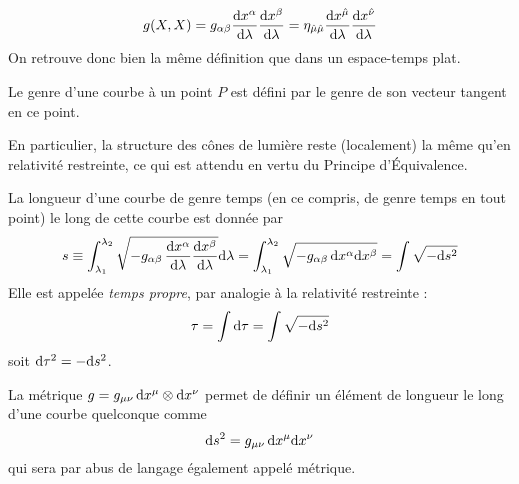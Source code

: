 \begin{equation}
   g(X, X) = g_{\alpha \beta}\frac{\mathrm{d} x^{\alpha}}{\mathrm{d} \lambda}\frac{\mathrm{d} x^{\beta}}{\mathrm{d} \lambda} = \eta_{\hat{\mu} \hat{\mu}}\frac{\mathrm{d} x^{\hat{\mu}}}{\mathrm{d} \lambda}\frac{\mathrm{d} x^{\hat{\nu}}}{\mathrm{d} \lambda}
\end{equation}
On retrouve donc bien la même définition que dans un espace-temps plat.
\begin{theoremframe}
    \begin{defi}
        Le genre d'une courbe à un point $P$ est défini par le genre de son vecteur tangent en ce point.
    \end{defi}
\end{theoremframe}
En particulier, la structure des cônes de lumière reste (localement) la même qu'en relativité restreinte, ce qui est attendu en vertu du Principe d'Équivalence.
\begin{theoremframe}
    \begin{defi}
        La longueur d'une courbe de genre temps (en ce compris, de genre temps en tout point) le long de cette courbe est donnée par 
            \begin{equation}
            s \equiv \int^{\lambda_2}_{\lambda_{1}}\sqrt{-g_{\alpha \beta}\,\frac{\mathrm{d} x^{\alpha}}{\mathrm{d}\lambda}\frac{\mathrm{d} x^{\beta}}{\mathrm{d} \lambda}} \mathrm{d}\lambda = \int^{\lambda_2}_{\lambda_{1}}\sqrt{-g_{\alpha \beta}\, \mathrm{d} x^{\alpha}\mathrm{d} x^{\beta}} =  \int \sqrt{-\mathrm{d} s^2 }
            \end{equation}
        Elle est appelée \emph{temps propre}, par analogie à la relativité restreinte :
        \begin{equation}
            \tau = \int \mathrm{d} \tau = \int \sqrt{-\mathrm{d} s^2 }
        \end{equation}
        soit $\mathrm{d} \tau^2 = - \mathrm{d} s^2$.
    \end{defi}
\end{theoremframe}

La métrique $g = g_{\mu \nu}\,\mathrm{d} x^{\mu}\otimes \mathrm{d} x^{\nu}$ permet de définir un élément de longueur le long d'une courbe quelconque comme
\begin{equation}
    \mathrm{d} s^2 = g_{\mu \nu}\,\mathrm{d} x^{\mu}\mathrm{d} x^{\nu}
\end{equation}
qui sera par abus de langage également appelé métrique. 
